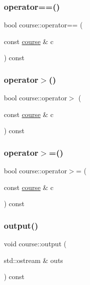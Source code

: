 \subsubsection{\texorpdfstring{operator==()}{operator==()}}
{\footnotesize\ttfamily bool course\+::operator== (\begin{DoxyParamCaption}\item[{const \hyperlink{classcourse}{course} \&}]{c }\end{DoxyParamCaption}) const\hspace{0.3cm}{\ttfamily [inline]}}

\hypertarget{classcourse_a16df685718a7ca9e98408b65109897b6}{}\label{classcourse_a16df685718a7ca9e98408b65109897b6} 
\subsubsection{\texorpdfstring{operator$>$()}{operator>()}}
{\footnotesize\ttfamily bool course\+::operator$>$ (\begin{DoxyParamCaption}\item[{const \hyperlink{classcourse}{course} \&}]{c }\end{DoxyParamCaption}) const\hspace{0.3cm}{\ttfamily [inline]}}

\hypertarget{classcourse_ad15d2508cfb6d22103aaec608bcfdc74}{}\label{classcourse_ad15d2508cfb6d22103aaec608bcfdc74} 
\subsubsection{\texorpdfstring{operator$>$=()}{operator>=()}}
{\footnotesize\ttfamily bool course\+::operator$>$= (\begin{DoxyParamCaption}\item[{const \hyperlink{classcourse}{course} \&}]{c }\end{DoxyParamCaption}) const\hspace{0.3cm}{\ttfamily [inline]}}

\hypertarget{classcourse_afdd5ccf71bbbb7797b75854f16bf373f}{}\label{classcourse_afdd5ccf71bbbb7797b75854f16bf373f} 
\subsubsection{\texorpdfstring{output()}{output()}}
{\footnotesize\ttfamily void course\+::output (\begin{DoxyParamCaption}\item[{std\+::ostream \&}]{outs }\end{DoxyParamCaption}) const}

